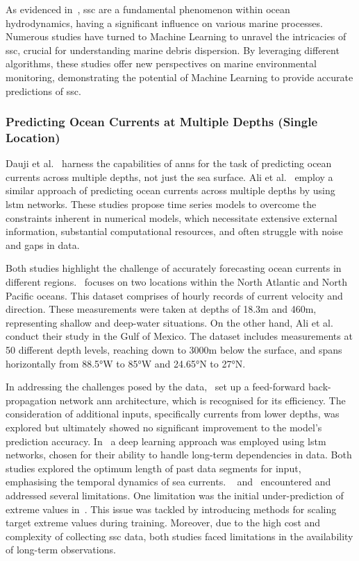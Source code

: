 As evidenced in~\cite{40}, \acrshort{ssc} are a fundamental phenomenon within ocean hydrodynamics, having a significant influence on various marine processes. Numerous studies have turned to Machine Learning to unravel the intricacies of \acrshort{ssc}, crucial for understanding marine debris dispersion. By leveraging different algorithms, these studies offer new perspectives on marine environmental monitoring, demonstrating the potential of Machine Learning to provide accurate predictions of \acrshort{ssc}.

\subsubsection{Predicting Ocean Currents at Multiple Depths (Single Location)}
\label{subsubsec:2.2.2.1}

Dauji et al.~\cite{41} harness the capabilities of \acrshort{ann}s for the task of predicting ocean currents across multiple depths, not just the sea surface. Ali et al.~\cite{42} employ a similar approach of predicting ocean currents across multiple depths by using \acrshort{lstm} networks. These studies propose time series models to overcome the constraints inherent in numerical models, which necessitate extensive external information, substantial computational resources, and often struggle with noise and gaps in data. 

Both studies highlight the challenge of accurately forecasting ocean currents in different regions.~\cite{41} focuses on two locations within the North Atlantic and North Pacific oceans. This dataset comprises of hourly records of current velocity and direction. These measurements were taken at depths of 18.3m and 460m, representing shallow and deep-water situations. On the other hand, Ali et al.~\cite{42} conduct their study in the Gulf of Mexico. The dataset includes measurements at 50 different depth levels, reaching down to 3000m below the surface, and spans horizontally from 88.5°W to 85°W and 24.65°N to 27°N.

In addressing the challenges posed by the data,~\cite{41} set up a feed-forward back-propagation network \acrshort{ann} architecture, which is recognised for its efficiency. The consideration of additional inputs, specifically currents from lower depths, was explored but ultimately showed no significant improvement to the model's prediction accuracy. In~\cite{42} a deep learning approach was employed using \acrshort{lstm} networks, chosen for their ability to handle long-term dependencies in data. Both studies explored the optimum length of past data segments for input, emphasising the temporal dynamics of sea currents. ~\cite{41} and~\cite{42} encountered and addressed several limitations. One limitation was the initial under-prediction of extreme values in~\cite{41}. This issue was tackled by introducing methods for scaling target extreme values during training. Moreover, due to the high cost and complexity of collecting \acrshort{ssc} data, both studies faced limitations in the availability of long-term observations.

